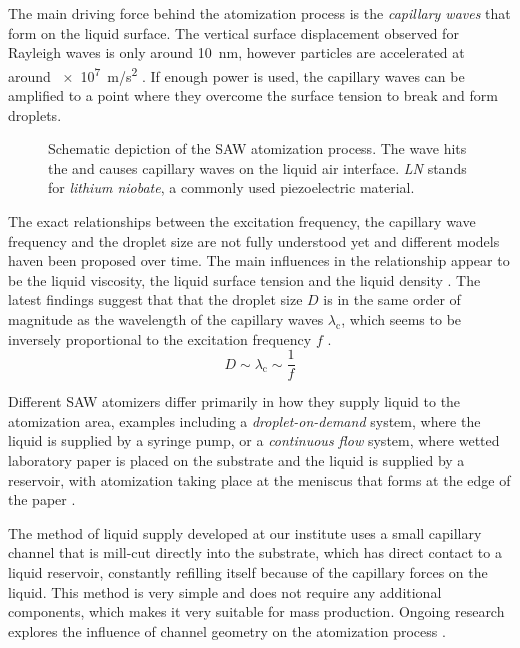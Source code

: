 The main driving force behind the atomization process is the \emph{capillary waves} that form on the liquid surface.
The vertical surface displacement observed for Rayleigh waves is only around \SI{10}{\nano\meter}, however particles are accelerated at around \SI{e7}{\meter/\second\squared} \cite{qiInterfacialDestabilizationAtomization2008}.
If enough power is used, the capillary waves can be amplified to a point where they overcome the surface tension to break and form droplets.

\begin{figure}[htbp]
    \centering
    \caption{Schematic depiction of the SAW atomization process. The wave hits the and causes capillary waves on the liquid air interface. \emph{LN} stands for \emph{lithium niobate}, a commonly used piezoelectric material. \cite{aishaqiInvestigationSAWAtomization2009}}
    \label{fig:atomization}
\end{figure}

The exact relationships between the excitation frequency, the capillary wave frequency and the droplet size are not fully understood yet and different models haven been proposed over time.
The main influences in the relationship appear to be the liquid viscosity, the liquid surface tension and the liquid density \cite{aishaqiInvestigationSAWAtomization2009,huangExperimentalResearchSurface2022}.
The latest findings suggest that that the droplet size $D$ is in the same order of magnitude as the wavelength of the capillary waves $\lambda_\text{c}$, which seems to be inversely proportional to the excitation frequency $f$ \cite{collinsAtomizationThinWater2012}.
$$
    D \sim \lambda_\text{c} \sim \frac{1}{f}
$$

Different SAW atomizers differ primarily in how they supply liquid to the atomization area, examples including a \emph{droplet-on-demand} system, where the liquid is supplied by a syringe pump, or a \emph{continuous flow} system, where wetted laboratory paper is placed  on the substrate and the liquid is supplied by a reservoir, with atomization taking place at the meniscus that forms at the edge of the paper \cite{winklerSAWbasedFluidAtomization2015a}.

The method of liquid supply developed at our institute uses a small capillary channel that is mill-cut directly into the substrate, which has direct contact to a liquid reservoir, constantly refilling itself because of the capillary forces on the liquid.
This method is very simple and does not require any additional components, which makes it very suitable for mass production.
Ongoing research explores the influence of channel geometry on the atomization process \cite{kapplAkustischInduzierteVernebelung2022}.

